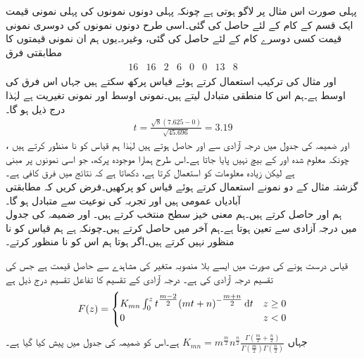 پہلی صورت اس مثال پر لاگو ہوتی ہے چونکہ پہلی دونوں نمونوں کی پہلی نمونی قیمت ایک قسم کے کام کے لئے حاصل کی گئی۔اسی طرح دونوں نمونوں کی دوسری نمونی قیمت کسی دوسرے کام کے لئے حاصل کی گئی، وغیرہ۔یوں ہم ان نمونی قیمتوں کا مطابقتی فرق
\begin{align*}
\begin{array}{rrrrrrrr}
16&16&2&6&0&0&13&8
\end{array}
\end{align*}
اور مثال  کی ترکیب استعمال کرتے ہوئے قیاس  پرکھ سکتے ہیں جہاں  اس فرق کی اوسط ہے۔ہم اس کا منطقی متبادل  لیتے ہیں۔نمونی اوسط  اور نمونی تغیریت  ہے لہٰذا درج ذیل ہو گا۔
\begin{align*}
t=\frac{\sqrt{8}(7.625-0)}{\sqrt{45.696}}=3.19
\end{align*}
،  اور ضمیمہ  کی جدول  میں  درجہ آزادی سے  اور  حاصل ہوتے ہیں لہٰذا ہم قیاس کو نا منظور کرتے ہیں چونکہ  معلوم شدہ  اور  کے بیچ نہیں پایا جاتا ہے۔اس طرح ہمارا موجودہ پرکھ، جو اسی نمونوں پر مبنی ہے لیکن زیادہ معلومات کو استعمال کرتا ہے، دکھاتا ہے کہ نتائج میں فرق کافی ہے۔ 
\quad {}\\
گزشتہ مثال کے دو نمونے استعمال کرتے ہوئے قیاس کو پرکھیں۔فرض کریں کہ مطابقتی آبادیاں عمومی ہیں اور تجربہ کی نوعیت سے متبادل  ہو گا۔\\
\quad
ہم  اور  حاصل کرتے ہیں۔ہم معنی خیز سطح  منتخب کرتے ہیں۔ اور ضمیمہ  کی جدول  میں  درجہ آزادی  سے  تعین ہوتا ہے۔ہم آخر میں  حاصل کرتے ہیں۔چونکہ  ہے ہم قیاس کو نا منظور نہیں کرتے ہیں۔اگر  ہوتا ہم اس کو نا منظور کرتے۔

قیاس درست ہونے کی صورت میں  ایسے بلا منصوبہ متغیر کی مشاہدے سے حاصل قیمت ہے جس کی تقسیم درجہ آزادی  کی   ہے۔   درجہ آزادی کے  تقسیم کا تفاعل تقسیم درج ذیل ہے
\begin{align}\label{مساوات_شماریات_ایف_تقسیم}
F(z)=
\begin{cases}
K_{mn}\int_{0}^{z} t^{\tfrac{m-2}{2}} (mt+n)^{-\tfrac{m+n}{2}}\dif t& z\ge 0\\
0&z<0
\end{cases}
\end{align}
جہاں 
$K_{mn}=m^{\tfrac{m}{2}}n^{\tfrac{n}{2}}\tfrac{\Gamma(\tfrac{m}{2}+\tfrac{n}{2})}{\Gamma(\tfrac{m}{2})\Gamma(\tfrac{n}{2})}$
ہے۔اس کو ضمیمہ  کی جدول  میں پیش کیا گیا ہے۔

